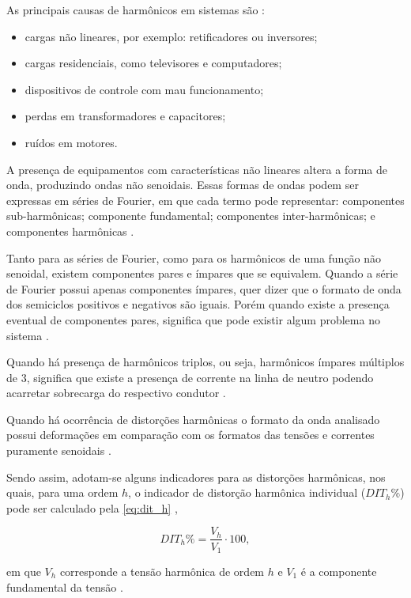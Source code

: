 As principais causas de harmônicos em sistemas são \cite{ref:fuchs_2015}:

\begin{itemize}
  \item cargas não lineares, por exemplo: retificadores ou inversores;
  \item cargas residenciais, como televisores e computadores;
  \item dispositivos de controle com mau funcionamento;
  \item perdas em transformadores e capacitores;
  \item ruídos em motores.
\end{itemize}

A presença de equipamentos com características não lineares altera a forma de onda, produzindo ondas não senoidais. Essas formas de ondas podem ser expressas em séries de Fourier, em que cada termo pode representar: componentes sub-harmônicas; componente fundamental; componentes inter-harmônicas; e componentes harmônicas \cite{ref:fuchs_2015}.

Tanto para as séries de Fourier, como para os harmônicos de uma função não senoidal, existem componentes pares e ímpares que se equivalem. Quando a série de Fourier possui apenas componentes ímpares, quer dizer que o formato de onda dos semiciclos positivos e negativos são iguais. Porém quando existe a presença eventual de componentes pares, significa que pode existir algum problema no sistema \cite{ref:fuchs_2015}.

Quando há presença de harmônicos triplos, ou seja, harmônicos ímpares múltiplos de 3, significa que existe a presença de corrente na linha de neutro podendo acarretar sobrecarga do respectivo condutor \cite{ref:fuchs_2015}.

Quando há ocorrência de distorções harmônicas o formato da onda analisado possui deformações em comparação com os formatos das tensões e correntes puramente senoidais \cite{ref:ANEEL2021}.

Sendo assim, adotam-se alguns indicadores para as distorções harmônicas, nos quais, para uma ordem $h$, o indicador de distorção harmônica individual ($DIT_h\%$) pode ser calculado pela \autoref{eq:dit_h} \cite{ref:ANEEL2021},

\begin{equation}
  DIT_h\% = \frac{V_h}{V_1}\cdot 100,
  \label{eq:dit_h}
\end{equation}

\noindent
em que $V_h$ corresponde a tensão harmônica de ordem $h$ e $V_1$ é a componente fundamental da tensão \cite{ref:ANEEL2021}.

